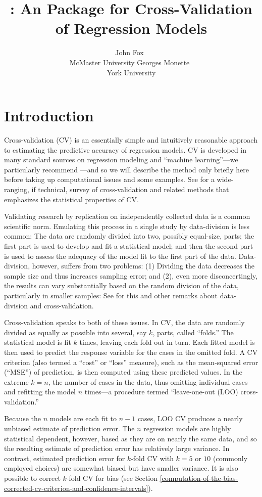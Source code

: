 \documentclass[
]{jss}
\author{
John Fox~\orcidlink{0000-0002-1196-8012}\\McMaster
University \And Georges Monette~\orcidlink{0000-0003-0076-5532}\\York
University
}
\title{\pkg{cv}: An \proglang{R} Package for Cross-Validation of
Regression Models}
\begin{document}
\hypertarget{introduction}{%
\section{Introduction}\label{introduction}}

Cross-validation (CV) is an essentially simple and intuitively
reasonable approach to estimating the predictive accuracy of regression
models. CV is developed in many standard sources on regression modeling
and ``machine learning''---we particularly recommend \citet[Secs. 5.1,
5.3]{JamesEtAl:2021}---and so we will describe the method only briefly
here before taking up computational issues and some examples. See
\citet{ArlotCelisse:2010} for a wide-ranging, if technical, survey of
cross-validation and related methods that emphasizes the statistical
properties of CV.

Validating research by replication on independently collected data is a
common scientific norm. Emulating this process in a single study by
data-division is less common: The data are randomly divided into two,
possibly equal-size, parts; the first part is used to develop and fit a
statistical model; and then the second part is used to assess the
adequacy of the model fit to the first part of the data. Data-division,
however, suffers from two problems: (1) Dividing the data decreases the
sample size and thus increases sampling error; and (2), even more
disconcertingly, the results can vary substantially based on the random
division of the data, particularly in smaller samples: See \citet[Sec.
5.3]{Harrell:2015} for this and other remarks about data-division and
cross-validation.

Cross-validation speaks to both of these issues. In CV, the data are
randomly divided as equally as possible into several, say \(k\), parts,
called ``folds.'' The statistical model is fit \(k\) times, leaving each
fold out in turn. Each fitted model is then used to predict the response
variable for the cases in the omitted fold. A CV criterion (also termed
a ``cost'' or ``loss'' measure), such as the mean-squared error
(``MSE'') of prediction, is then computed using these predicted values.
In the extreme \(k = n\), the number of cases in the data, thus omitting
individual cases and refitting the model \(n\) times---a procedure
termed ``leave-one-out (LOO) cross-validation.''

Because the \(n\) models are each fit to \(n - 1\) cases, LOO CV
produces a nearly unbiased estimate of prediction error. The \(n\)
regression models are highly statistical dependent, however, based as
they are on nearly the same data, and so the resulting estimate of
prediction error has relatively large variance. In contrast, estimated
prediction error for \(k\)-fold CV with \(k = 5\) or \(10\) (commonly
employed choices) are somewhat biased but have smaller variance. It is
also possible to correct \(k\)-fold CV for bias (see Section
\ref{computation-of-the-bias-corrected-cv-criterion-and-confidence-intervals}).
\end{document}
